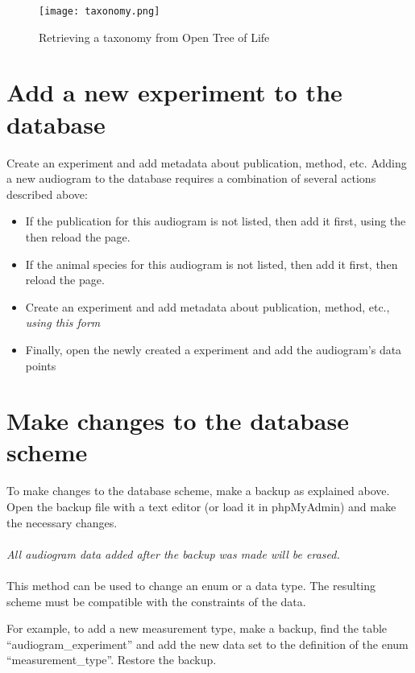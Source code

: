 \documentclass{article}
\begin{document}
\begin{figure}
\texttt{[image: taxonomy.png]}
\caption{Retrieving a taxonomy from Open Tree of Life}
\label{fig:taxonomy}
\end{figure}

\section{Add a new experiment to the database}
Create an experiment and add metadata about publication, method, etc.
Adding a new audiogram to the database requires a combination of several actions described above:

\begin{itemize}
\item{If the publication for this audiogram is not listed, then add it first, using the then reload the page.}
\item{If the animal species for this audiogram is not listed, then add it first, then reload the page.}
\item{Create an experiment and add metadata about publication, method, etc., \emph{using this form}}
\item{Finally, open the newly created a experiment and add the audiogram's data points}
\end{itemize}

\section{Make changes to the database scheme}
To make changes to the database scheme, make a backup as explained above. Open the backup file with a text editor (or load it in phpMyAdmin) and make the necessary changes.
\\\\
\emph{All audiogram data added after the backup was made will be erased.}
\\\\
This method can be used to change an enum or a data type. The resulting scheme must be compatible with the constraints of the data.

For example, to add a new measurement type, make a backup, find the table ``audiogram\_experiment'' and add the new data set to the definition of the enum ``measurement\_type''. Restore the backup.
\end{document}
